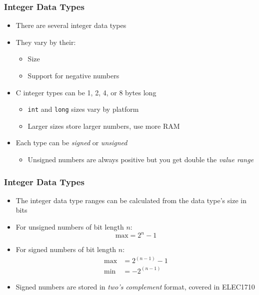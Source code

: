 \documentclass[14pt]{beamer}
\begin{document}
\begin{frame}
\frametitle{Integer Data Types}
\begin{itemize}
\item There are several integer data types
\item They vary by their:
	\begin{itemize}
		\item Size
		\item Support for negative numbers
	\end{itemize}
\item C integer types can be 1, 2, 4, or 8 bytes long
	\begin{itemize}
		\item \texttt{int} and \texttt{long} sizes vary by platform
		\item Larger sizes store larger numbers, use more RAM
	\end{itemize}
\item Each type can be \textit{signed} or \textit{unsigned}
	\begin{itemize}
		\item Unsigned numbers are always positive but you get double the \textit{value range}
	\end{itemize}
\end{itemize}
\end{frame}

\begin{frame}
\frametitle{Integer Data Types}
\begin{itemize}
\item The integer data type ranges can be calculated from the data type's size in bits
\item For unsigned numbers of bit length $n$:
\begin{equation}
\textrm{max} = 2^{n} - 1
\end{equation}
\item For signed numbers of bit length $n$:
\begin{align}
\textrm{max} &= 2^{(n-1)} - 1 \\
\textrm{min} &= -2^{(n-1)}
\end{align}
\item Signed numbers are stored in \textit{two's complement} format, covered in ELEC1710
\end{itemize}
\end{frame}
\end{document}

